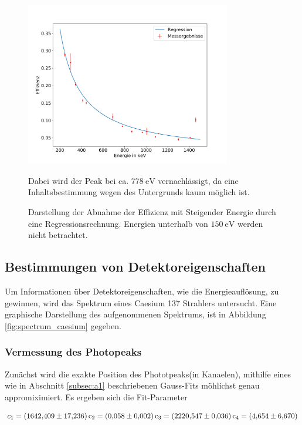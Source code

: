 \begin{figure}
\centering
\includegraphics[width=0.8\textwidth]{python/plots/effizienz.pdf}
\caption{Darstellung der Abnahme der Effizienz mit Steigender Energie durch eine Regressionsrechnung. Energien unterhalb von $\SI{150}{\electronvolt}$ werden nicht betrachtet.}
Dabei wird der Peak bei ca. $\SI{778}{\electronvolt}$ vernachlässigt, da eine Inhaltsbestimmung wegen des Untergrunds kaum möglich ist.
\label{fig:Effizienz}
\end{figure}

\subsection{Bestimmungen von Detektoreigenschaften}
\label{subsec:a2}
Um Informationen über Detektoreigenschaften, wie die Energieauflösung, zu gewinnen, wird das Spektrum eines Caesium 137 Strahlers untersucht. Eine graphische Darstellung des aufgenommenen
Spektrums, ist in Abbildung \ref{fig:spectrum_caesium} gegeben.

\subsubsection{Vermessung des Photopeaks}
\label{subsubsec:a21}
Zunächst wird die exakte Position des Phototpeaks(in Kanaelen), mithilfe eines wie in Abschnitt \ref{subsec:a1} beschriebenen Gauss-Fits
möhlichst genau appromiximiert. Es ergeben sich die Fit-Parameter

\begin{align*}
  c_{1} = \SI{1642.409+-17.236}
  c_{2} = \SI{0.058+-0.002}
  c_{3} = \SI{2220.547+-0.036}
  c_{4} = \SI{4.654+-6.670}.
\end{align*}

